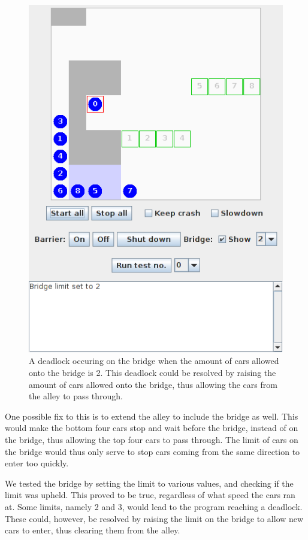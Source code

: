\begin{figure}[H]
    \centering
    \includegraphics[scale=.4]{Step5/bridge_deadlock.png}
    \caption{A deadlock occuring on the bridge when the amount of cars allowed onto the bridge is 2. This deadlock could be resolved by raising the amount of cars allowed onto the bridge, thus allowing the cars from the alley to pass through.}
    \label{fig:bridge_deadlock}
\end{figure}

One possible fix to this is to extend the alley to include the bridge as well. This would make the bottom four cars stop and wait before the bridge, instead of on the bridge, thus allowing the top four cars to pass through. The limit of cars on the bridge would thus only serve to stop cars coming from the same direction to enter too quickly.  

We tested the bridge by setting the limit to various values, and checking if the limit was upheld. This proved to be true, regardless of what speed the cars ran at. Some limits, namely 2 and 3, would lead to the program reaching a deadlock. These could, however, be resolved by raising the limit on the bridge to allow new cars to enter, thus clearing them from the alley.



